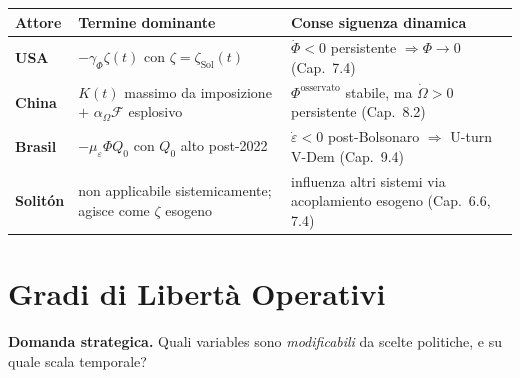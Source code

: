 {\def\LTcaptype{none} %
{\small\begin{longtable}[]{@{}
  >{\raggedright\arraybackslash}p{}
  >{\raggedright\arraybackslash}p{}
  >{\raggedright\arraybackslash}p{}@{}}
\toprule\noalign{}
\begin{minipage}[b]{\linewidth}\raggedright
Attore
\end{minipage} & \begin{minipage}[b]{\linewidth}\raggedright
Termine dominante
\end{minipage} & \begin{minipage}[b]{\linewidth}\raggedright
Conse siguenza dinamica
\end{minipage} \\
\midrule\noalign{}
\endhead
\bottomrule\noalign{}
\endlastfoot
\textbf{USA} & \(-\gamma_\Phi \zeta(t)\) con
\(\zeta = \zeta_{\text{Sol}}(t)\) & \(\dot\Phi < 0\) persistente
\(\Rightarrow \Phi \to 0\) (Cap.~7.4) \\
\textbf{China} & \(K(t)\) massimo da imposizione \(+\)
\(\alpha_\Omega \mathcal{F}\) esplosivo & \(\Phi^{\text{osservato}}\)
stabile, ma \(\dot\Omega > 0\) persistente (Cap.~8.2) \\
\textbf{Brasil} & \(-\mu_\varepsilon \Phi Q_0\) con \(Q_0\) alto
post-2022 & \(\dot\varepsilon < 0\) post-Bolsonaro \(\Rightarrow\)
U-turn V-Dem (Cap.~9.4) \\
\textbf{Solitón} & non applicabile sistemicamente; agisce come
\(\zeta\) esogeno & influenza altri sistemi via acoplamiento esogeno
(Cap.~6.6, 7.4) \\
\end{longtable}}
}



\section{Gradi di Libertà
Operativi}\label{gradi-di-libertuxe0-operativi}

\Hypoth{} \textbf{Domanda strategica.} Quali variables sono
\emph{modificabili} da scelte politiche, e su quale scala temporale?

